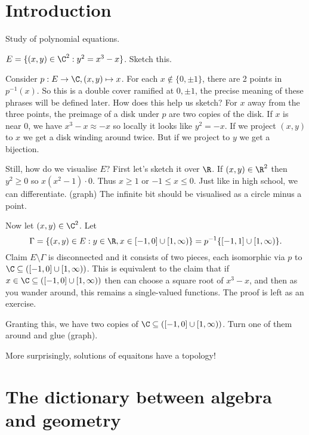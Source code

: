 \documentclass[a4paper]{article}
\begin{document}


\tableofcontents

\section{Introduction}

Study of polynomial equations.

\begin{eg}
  \(E = \{(x, y) \in \C^2: y^2 = x^3 - x\}\). Sketch this.

  Consider \(p: E \to \C, (x, y) \mapsto x\). For each \(x \notin \{0, \pm 1\}\), there are 2 points in \(p^{-1}(x)\). So this is a double cover ramified at \(0, \pm 1\), the precise meaning of these phrases will be defined later. How does this help us sketch? For \(x\) away from the three points, the preimage of a disk under \(p\) are two copies of the disk. If \(x\) is near \(0\), we have \(x^3 - x \approx -x\) so locally it looks like \(y^2 = -x\). If we project \((x, y)\) to \(x\) we get a disk winding around twice. But if we project to \(y\) we get a bijection.

  Still, how do we visualise \(E\)? First let's sketch it over \(\R\). If \((x, y) \in \R^2\) then \(y^2 \geq 0\) so \(x(x^2 - 1) \cdot 0\). Thus \(x \geq 1\) or \(-1 \leq x \leq 0\). Just like in high school, we can differentiate. (graph) The infinite bit should be visualised as a circle minus a point.

  Now let \((x, y) \in \C^2\). Let
  \[
    \Gamma = \{(x, y) \in E: y \in \R, x \in [-1, 0] \cup [1, \infty)\} = p^{-1}\{[-1, 1] \cup [1, \infty)\}.
  \]
  Claim \(E \setminus \Gamma\) is disconnected and it consists of two pieces, each isomorphic via \(p\) to \(\C \subseteq ([-1, 0] \cup [1, \infty))\). This is equivalent to the claim that if \(x \in \C \subseteq ([-1, 0] \cup [1, \infty))\) then can choose a square root of \(x^3 - x\), and then as you wander around, this remains a single-valued functions. The proof is left as an exercise.

  Granting this, we have two copies of \(\C \subseteq ([-1, 0] \cup [1, \infty))\). Turn one of them around and glue (graph).

  More surprisingly, solutions of equaitons have a topology!
\end{eg}

\section{The dictionary between algebra and geometry}
\end{document}
